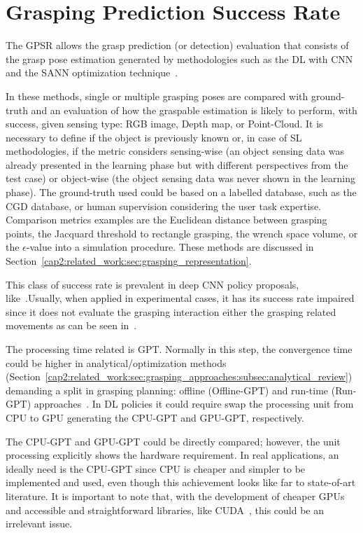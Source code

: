 \section{Grasping Prediction Success Rate}
\label{cap3:grasping_eval:sec:gpsr}

The \ac{GPSR} allows the grasp prediction (or detection) evaluation that consists of the grasp pose estimation generated by methodologies such as the \ac{DL} with \ac{CNN}~\cite{Mahler2019} and the \ac{SANN} optimization technique~\cite{AndrewT2004,carvalho2020}.

In these methods, single or multiple grasping poses are compared with ground-truth and an evaluation of how the graspable estimation is likely to perform, with success, given sensing type: RGB image, Depth map, or Point-Cloud. It is necessary to define if the object is previously known or, in case of \ac{SL} methodologies, if the metric considers sensing-wise (an object sensing data was already presented in the learning phase but with different perspectives from the test case) or object-wise (the object sensing data was never shown in the learning phase). The ground-truth used could be based on a labelled database, such as the \ac{CGD} database, or human supervision considering the user task expertise. Comparison metrics examples are the Euclidean distance between grasping points, the Jacquard threshold to rectangle grasping, the wrench space volume, or the $\epsilon$-value into a simulation procedure. These methods are discussed in Section~\ref{cap2:related_work:sec:grasping_representation}.

This class of success rate is prevalent in deep \ac{CNN} policy proposals, like~\cite{Redmon2015,Kumra2017,asif2018ensemblenet,song2020novel}.Usually, when applied in experimental cases, it has its success rate impaired since it does not evaluate the grasping interaction either the grasping related movements as can be seen in~\cite{Chu2018}.

The processing time related is \ac{GPT}. Normally in this step, the convergence time could be higher in analytical/optimization methods (Section~\ref{cap2:related_work:sec:grasping_approaches:subsec:analytical_review}) demanding a split in grasping planning: offline (\ac{Offline-GPT}) and run-time (\ac{Run-GPT}) approaches~\cite{carvalho2020}. In \ac{DL} policies it could require swap the processing unit from \ac{CPU} to \ac{GPU} generating the \ac{CPU-GPT} and \ac{GPU-GPT}, respectively.

The \ac{CPU-GPT} and \ac{GPU-GPT} could be directly compared; however, the unit processing explicitly shows the hardware requirement. In real applications, an ideally need is the \ac{CPU-GPT}  since \ac{CPU} is cheaper and simpler to be implemented and used, even though this achievement looks like far to state-of-art literature. It is important to note that, with the development of cheaper \acp{GPU} and accessible and straightforward libraries, like CUDA~\cite{cuda}, this could be an irrelevant issue.


